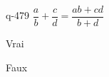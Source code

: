 \begin{truefalse}{q-479}
$\dfrac{a}{b}+ \dfrac{c}{d} =\dfrac{ab+cd}{b+d}$
\item Vrai
\item* Faux
\end{truefalse}

